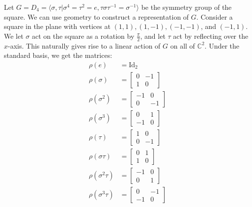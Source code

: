 \begin{example}\label{rep-of-d8}
Let $G = D_4 = \langle \sigma, \tau |  \sigma^4 = \tau^2 = e, \tau \sigma \tau^{-1} = \sigma^{-1} \rangle$ be the symmetry group of the square.  We can use geometry to construct a representation of $G$.  Consider a square in the plane with vertices at $(1,1), (1,-1), (-1, -1)$, and $(-1, 1)$.  We let $\sigma$ act on the square as a rotation by $\frac{\pi}{2}$, and let $\tau$ act by reflecting over the $x$-axis.  This naturally gives rise to a linear action of $G$ on all of $\mathbb{C}^2$.  Under the standard basis, we get the matrices:
\begin{align*}
\rho( e) &= \text{Id}_2 \\
\rho (\sigma) &= \begin{bmatrix} 0 & -1 \\ 1 & 0  \end{bmatrix} \\
\rho (\sigma^2) &= \begin{bmatrix} -1 & 0 \\ 0 & -1  \end{bmatrix} \\ 
\rho (\sigma^3) &= \begin{bmatrix} 0 & 1 \\ -1 & 0  \end{bmatrix} \\
\rho (\tau) &= \begin{bmatrix} 1 & 0 \\ 0 & -1\end{bmatrix} \\
\rho (\sigma \tau ) &= \begin{bmatrix} 0 & 1 \\ 1 & 0\end{bmatrix} \\
\rho (\sigma^2 \tau) &= \begin{bmatrix} -1 & 0 \\ 0 & 1\end{bmatrix} \\
\rho (\sigma^3 \tau) &= \begin{bmatrix} 0 & -1 \\ -1 & 0\end{bmatrix}
\end{align*}

\end{example}

